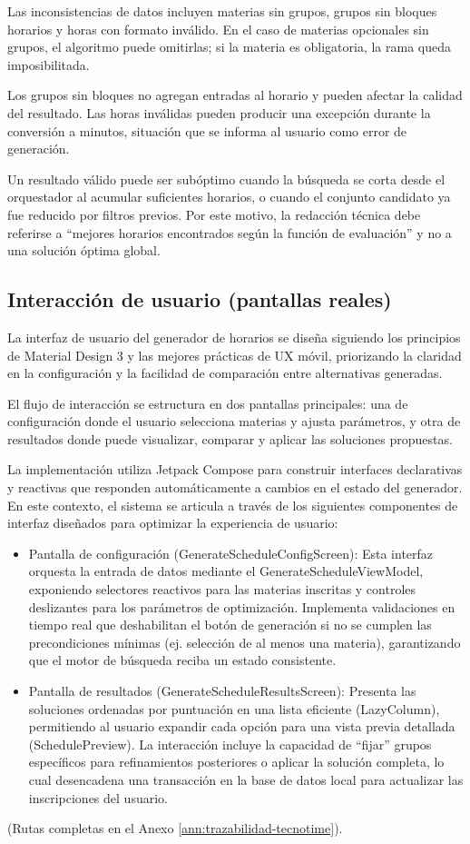 Las inconsistencias de datos incluyen materias sin grupos, grupos sin bloques horarios y horas con formato inválido. En el caso de materias opcionales sin grupos, el algoritmo puede omitirlas; si la materia es obligatoria, la rama queda imposibilitada.

Los grupos sin bloques no agregan entradas al horario y pueden afectar la calidad del resultado. Las horas inválidas pueden producir una excepción durante la conversión a minutos, situación que se informa al usuario como error de generación.

Un resultado válido puede ser subóptimo cuando la búsqueda se corta desde el orquestador al acumular suficientes horarios, o cuando el conjunto candidato ya fue reducido por filtros previos. Por este motivo, la redacción técnica debe referirse a ``mejores horarios encontrados según la función de evaluación'' y no a una solución óptima global.

\subsection{Interacción de usuario (pantallas reales)}
La interfaz de usuario del generador de horarios se diseña siguiendo los principios de Material Design 3 y las mejores prácticas de UX móvil, priorizando la claridad en la configuración y la facilidad de comparación entre alternativas generadas.

El flujo de interacción se estructura en dos pantallas principales: una de configuración donde el usuario selecciona materias y ajusta parámetros, y otra de resultados donde puede visualizar, comparar y aplicar las soluciones propuestas.

La implementación utiliza Jetpack Compose para construir interfaces declarativas y reactivas que responden automáticamente a cambios en el estado del generador. En este contexto, el sistema se articula a través de los siguientes componentes de interfaz diseñados para optimizar la experiencia de usuario:

\begin{itemize}
  \item Pantalla de configuración (GenerateScheduleConfigScreen): Esta interfaz orquesta la entrada de datos mediante el GenerateScheduleViewModel, exponiendo selectores reactivos para las materias inscritas y controles deslizantes para los parámetros de optimización. Implementa validaciones en tiempo real que deshabilitan el botón de generación si no se cumplen las precondiciones mínimas (ej. selección de al menos una materia), garantizando que el motor de búsqueda reciba un estado consistente.
  \item Pantalla de resultados (GenerateScheduleResultsScreen): Presenta las soluciones ordenadas por puntuación en una lista eficiente (LazyColumn), permitiendo al usuario expandir cada opción para una vista previa detallada (SchedulePreview). La interacción incluye la capacidad de ``fijar'' grupos específicos para refinamientos posteriores o aplicar la solución completa, lo cual desencadena una transacción en la base de datos local para actualizar las inscripciones del usuario.
\end{itemize}
(Rutas completas en el Anexo \ref{ann:trazabilidad-tecnotime}).

